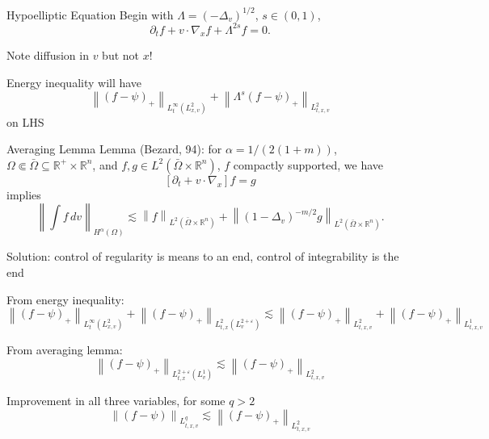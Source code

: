 \documentclass{beamer}
\newcommand{\R}{\mathbb{R}}
\newcommand{\eps}{\varepsilon}
\newcommand{\norm}[1]{\left\lVert#1\right\rVert}
\newcommand{\bracket}[1]{\left[ #1 \right]}
\newcommand{\abs}[1]{\left\lvert #1 \right\rvert}
\newcommand{\del}{\partial}
\newcommand{\grad}{\nabla}
\newcommand{\Laplace}{\Delta}
\begin{document}
\begin{frame}{Hypoelliptic Equation}
Begin with $\Lambda = (-\Laplace_v)^{1/2}$, $s \in (0,1)$,
\[ \del_t f + v\cdot\grad_x f + \Lambda^{2s} f = 0. \]

Note diffusion in $v$ but not $x$!

Energy inequality will have
\[ \norm{(f-\psi)_+}_{L^\infty_t(L^2_{x,v})} + \norm{\Lambda^s (f-\psi)_+}_{L^2_{t,x,v}} \]
on LHS
\end{frame}


\begin{frame}{Averaging Lemma}
Lemma (Bezard, 94): for $\alpha = 1/(2(1+m))$, $\Omega \Subset \bar{\Omega} \subseteq \R^+ \times \R^n$, and $f,g \in L^2(\bar{\Omega} \times \R^n)$, $f$ compactly supported, we have
\[ \bracket{\del_t + v\cdot\grad_x} f = g \]
implies
\[ \norm{\int f \,dv}_{H^\alpha(\Omega)} \lesssim \norm{f}_{L^2(\bar{\Omega} \times \R^n)} + \norm{(1-\Laplace_v)^{-m/2} g }_{L^2(\bar{\Omega} \times \R^n)}. \]
\end{frame}




\begin{frame}
Solution: control of regularity is means to an end, control of integrability is the end

From energy inequality:
\[ \norm{(f-\psi)_+}_{L^\infty_t(L^2_{x,v})} + \norm{(f-\psi)_+}_{L^2_{t,x}(L^{2+\eps}_v)} \lesssim \norm{(f-\psi)_+}_{L^2_{t,x,v}} + \norm{(f-\psi)_+}_{L^1_{t,x,v}} \]

From averaging lemma:
\[ \norm{(f-\psi)_+}_{L^{2+\eps}_{t,x}(L^1_v)} \lesssim \norm{(f-\psi)_+}_{L^2_{t,x,v}} \]

Improvement in all three variables, for some $q > 2$
\[ \norm{(f-\psi)}_{L^q_{t,x,v}} \lesssim \norm{(f-\psi)_+}_{L^2_{t,x,v}} \]
\end{frame}
\end{document}

